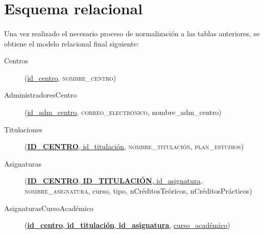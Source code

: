 \section{Esquema relacional}

  \paragraph{}Una vez realizado el necesario proceso de normalización a las
  tablas anteriores, se obtiene el modelo relacional final siguiente:

  \begin{description}
    \item[Centros] \begin{flushleft}(\underline{id\_centro},
    \textsc{nombre\_centro})\end{flushleft}
  \end{description}

  \begin{description}
    \item[AdministradoresCentro] \begin{flushleft}(\underline{id\_adm\_centro},
    \textsc{correo\_electrónico}, nombre\_adm\_centro)\end{flushleft}
  \end{description}

  \begin{description}
    \item[Titulaciones] \begin{flushleft}(\underline{\textbf{ID\_CENTRO},
    id\_titulación}, \textsc{nombre\_titulación},
    \textsc{plan\_estudios})\end{flushleft}
  \end{description}

  \begin{description}
    \item[Asignaturas] \begin{flushleft}(\underline{\textbf{ID\_CENTRO},
    \textbf{ID\_TITULACIÓN}, id\_asignatura},
    \textsc{nombre\_asignatura}, curso, tipo, nCréditosTeóricos,
    nCréditosPrácticos)\end{flushleft}
  \end{description}

  \begin{description}
    \item[AsignaturasCursoAcadémico] \begin{flushleft}(\underline{\textbf{id\_centro},
    \textbf{id\_titulación}, \textbf{id\_asignatura},} \underline{curso\_académico})
    \end{flushleft}
  \end{description}

